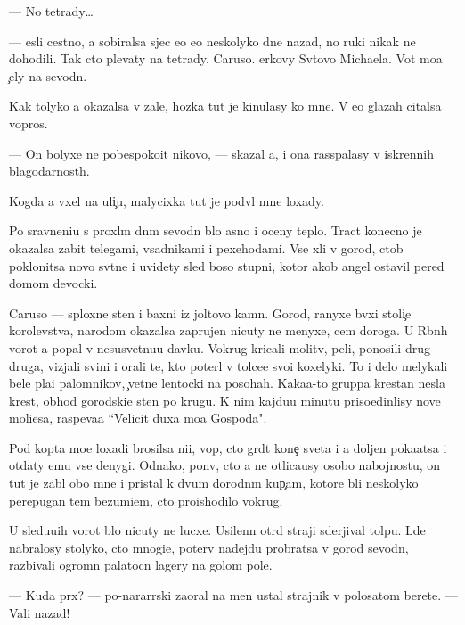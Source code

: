 \documentclass[10pt]{book}
\begin{document}
— No tetrady…

— {\Y}esli cestno, {\y}a sobiralsa sjec {\y}e{\y}o {\y}e{\x}o neskolyko dne{\y} nazad, no ruki nikak ne dohodili. Tak cto plevaty na tetrady. Caruso. {\C}erkovy Sv{\ia}tovo Michaela. Vot mo{\y}a {\c}ely na sevodn{\ia}.

Kak tolyko {\y}a okazalsa v zale, hoz{\ia}{\y}ka tut je kinulasy ko mne. V {\y}e{\y}o glazah citalsa vopros.

— On bolyxe ne pobespoko{\y}it nikovo, — skazal {\y}a, i ona rass{\yi}palasy v iskrennih blagodarnost{\ia}h.

Kogda {\y}a v{\yi}xel na uli{\c}u, malycixka tut je podv{\e}l mne loxady.

Po sravneni{\y}u s proxl{\yi}m dn{\e}m sevodn{\ia} b{\yi}lo {\y}asno i oceny teplo. Tract konecno je okazalsa zabit telegami, vsadnikami i pexehodami. Vse xli v gorod, ctob{\yi} poklonitsa novo{\y} sv{\ia}t{\yi}ne i uvidety sled boso{\y} stupni, kotor{\yi}{\y} {\y}akob{\yi} angel ostavil pered domom devocki.

Caruso — sploxn{\yi}{\y}e sten{\yi} i baxni iz joltovo kamn{\ia}. Gorod, ranyxe b{\yi}vxi{\y} stoli{\c}e{\y} korolevstva, narodom okazalsa zaprujen nicuty ne menyxe, cem doroga. U R{\yi}bn{\yi}h vorot {\y}a popal v nesusvetnu{\y}u davku. Vokrug kricali molitv{\yi}, peli, ponosili drug druga, vizjali svin{\yf}i i orali te, kto poter{\ia}l v tolce{\y}e svo{\y}i koxelyki. To i delo melykali bel{\yi}{\y}e pla{\x}i palomnikov, {\c}vetn{\yi}{\y}e lentocki na posohah. Kaka{\y}a-to gruppa krest{\y}an nesla krest, obhod{\ia} gorodski{\y}e sten{\yi} po krugu. K nim kajdu{\y}u minutu priso{\y}edin{\ia}lisy nov{\yi}{\y}e mol{\ia}{\x}i{\y}esa, raspeva{\y}a ``Velicit duxa mo{\y}a Gospoda".

Pod kop{\yi}ta mo{\y}e{\y} loxadi brosilsa ni{\x}i{\y}, vop{\ia}, cto gr{\ia}d{\e}t kone{\c} sveta i {\y}a doljen poka{\y}atsa i otdaty {\y}emu vse denygi. Odnako, pon{\ia}v, cto {\y}a ne otlica{\y}usy osobo{\y} nabojnost{\y}u, on tut je zab{\yi}l obo mne i pristal k dvum dorodn{\yi}m kup{\c}am, kotor{\yi}{\y}e b{\yi}li neskolyko perepugan{\yi} tem bezumi{\y}em, cto proishodilo vokrug.

U sledu{\y}u{\x}ih vorot b{\yi}lo nicuty ne lucxe. Usilenn{\yi}{\y} otr{\ia}d straji sderjival tolpu. L{\io}de{\y} nabralosy stolyko, cto mnogi{\y}e, poter{\ia}v nadejdu probratsa v gorod sevodn{\ia}, razbivali ogromn{\yi}{\y} palatocn{\yi}{\y} lagery na golom pole.

— Kuda pr{\e}x? — po-nararrski zaoral na men{\ia} ustal{\yi}{\y} strajnik v polosatom berete. — Vali nazad!
\end{document}
